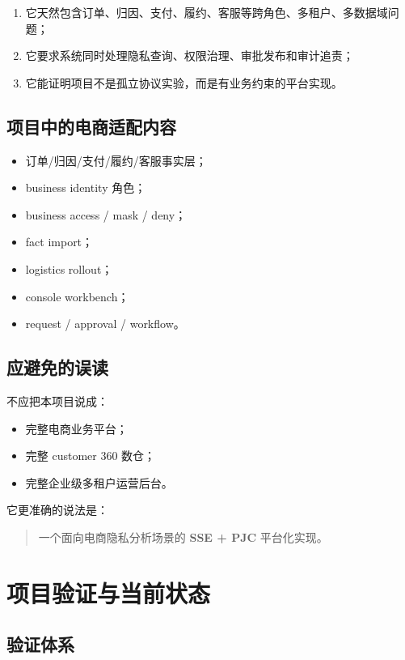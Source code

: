 \documentclass[UTF8,a4paper,12pt,oneside]{ctexrep}
\begin{document}
\begin{enumerate}
  \item 它天然包含订单、归因、支付、履约、客服等跨角色、多租户、多数据域问题；
  \item 它要求系统同时处理隐私查询、权限治理、审批发布和审计追责；
  \item 它能证明项目不是孤立协议实验，而是有业务约束的平台实现。
\end{enumerate}

\section{项目中的电商适配内容}

\begin{itemize}
  \item 订单/归因/支付/履约/客服事实层；
  \item business identity 角色；
  \item business access / mask / deny；
  \item fact import；
  \item logistics rollout；
  \item console workbench；
  \item request / approval / workflow。
\end{itemize}

\section{应避免的误读}

不应把本项目说成：

\begin{itemize}
  \item 完整电商业务平台；
  \item 完整 customer 360 数仓；
  \item 完整企业级多租户运营后台。
\end{itemize}

它更准确的说法是：

\begin{quote}
一个面向电商隐私分析场景的 \textbf{SSE + PJC} 平台化实现。
\end{quote}

\chapter{项目验证与当前状态}

\section{验证体系}
\end{document}
